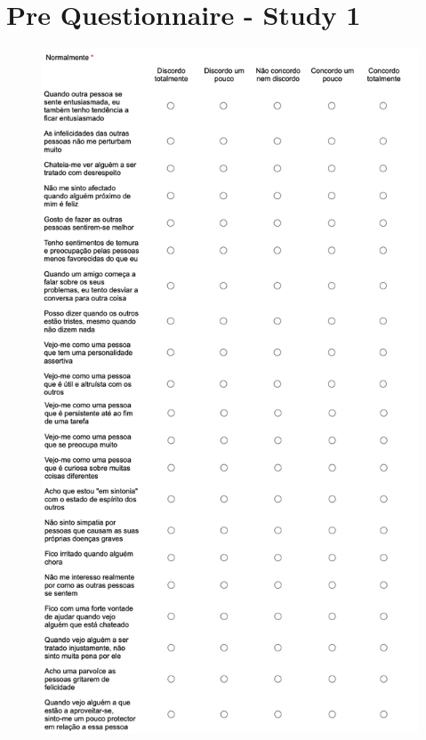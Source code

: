 \section{Pre Questionnaire - Study 1}
\label{appendix:pre}
\begin{figure}[h!]
\centering
\includegraphics[scale=0.25]{figures/pre.png}
\end{figure}

\clearpage

